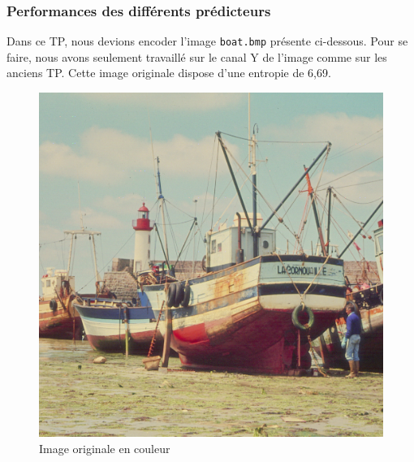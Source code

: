 \documentclass[12pt]{report}
\begin{document}
\subsubsection{Performances des différents prédicteurs}

Dans ce TP, nous devions encoder l'image \texttt{boat.bmp} présente ci-dessous. Pour se faire, nous avons seulement travaillé sur le canal Y de l'image comme sur les anciens TP. Cette image originale dispose d'une entropie de 6,69.

\begin{figure}[H]
\begin{center}
\includegraphics[scale=0.4]{../boats.jpg} 
\caption{Image originale en couleur}
\end{center}
\end{figure}
\end{document}
